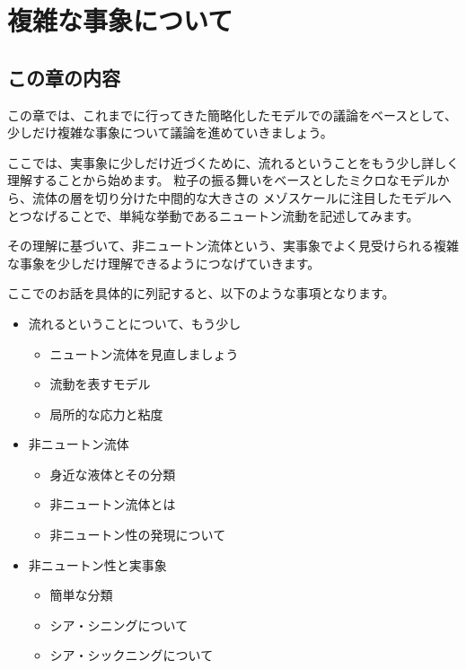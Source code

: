 \documentclass[uplatex,dvipdfmx,a4paper,11pt]{jsreport}
\begin{document}
\setcounter{chapter}{6}
\chapter{複雑な事象について}

\section*{この章の内容}

この章では、これまでに行ってきた簡略化したモデルでの議論をベースとして、少しだけ複雑な事象について議論を進めていきましょう。

ここでは、実事象に少しだけ近づくために、流れるということをもう少し詳しく理解することから始めます。
粒子の振る舞いをベースとしたミクロなモデルから、流体の層を切り分けた中間的な大きさの
メゾスケールに注目したモデルへとつなげることで、単純な挙動であるニュートン流動を記述してみます。

その理解に基づいて、非ニュートン流体という、実事象でよく見受けられる複雑な事象を少しだけ理解できるようにつなげていきます。

ここでのお話を具体的に列記すると、以下のような事項となります。
\begin{boxnote}
    \begin{itemize}
		\item 流れるということについて、もう少し
		\begin{itemize}
			\item ニュートン流体を見直しましょう
			\item 流動を表すモデル
			\item 局所的な応力と粘度
		\end{itemize} 
		\item 非ニュートン流体
		\begin{itemize}
			\item 身近な液体とその分類
			\item 非ニュートン流体とは
			\item 非ニュートン性の発現について
		\end{itemize} 
		\item 非ニュートン性と実事象
		\begin{itemize}
			\item 簡単な分類
			\item シア・シニングについて
			\item シア・シックニングについて
		\end{itemize}
	\end{itemize}
\end{boxnote}
\end{document}
